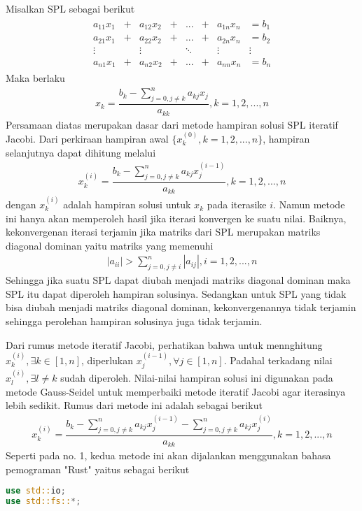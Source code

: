 \documentclass[12pt]{article}
\begin{document}
\begin{enumerate}
{        Misalkan SPL sebagai berikut
        \begin{align*}
            \begin{matrix}
                a_{11}x_1 & + & a_{12}x_2 & + & ...   & + & a_{1n}x_n & = b_1 \\
                a_{21}x_1 & + & a_{22}x_2 & + & ...   & + & a_{2n}x_n & = b_2 \\
                \vdots    &   & \vdots    &   & \ddots&   & \vdots      & \vdots \\
                a_{n1}x_1 & + & a_{n2}x_2 & + &...    & + & a_{nn}x_n & = b_n 
            \end{matrix}
        \end{align*}
        Maka berlaku
        \begin{align*}
            x_k = \dfrac{b_k - \displaystyle\sum_{j = 0, j \ne k}^n a_{kj}x_j}{a_{kk}}, k = 1,2, ..., n
        \end{align*}
        Persamaan diatas merupakan dasar dari metode hampiran solusi SPL iteratif Jacobi. Dari perkiraan hampiran awal $ \{x_k^{(0)}, k = 1,2,...,n\} $, hampiran selanjutnya dapat dihitung melalui
        \begin{align*}
            x_k^{(i)} = \dfrac{b_k - \displaystyle\sum_{j = 0, j \ne k}^n a_{kj}x_j^{(i-1)}}{a_{kk}}, k = 1,2, ..., n
        \end{align*}
        dengan $ x_k^{(i)} $ adalah hampiran solusi untuk $ x_k $ pada iterasike $ i $. Namun metode ini hanya akan memperoleh hasil jika iterasi konvergen ke suatu nilai. Baiknya, kekonvergenan iterasi terjamin jika matriks dari SPL merupakan matriks diagonal dominan yaitu matriks yang memenuhi
        \begin{align*}
            |a_{ii}| > \sum_{j = 0, j \ne i}^n |a_{ij}|, i = 1,2,...,n
        \end{align*}
        Sehingga jika suatu SPL dapat diubah menjadi matriks diagonal dominan maka SPL itu dapat diperoleh hampiran solusinya. Sedangkan untuk SPL yang tidak bisa diubah menjadi matriks diagonal dominan, kekonvergenannya tidak terjamin sehingga perolehan hampiran solusinya juga tidak terjamin.\bigskip

        Dari rumus metode iteratif Jacobi, perhatikan bahwa untuk mennghitung $ x_k^{(i)}, \exists k \in [1,n] $, diperlukan $ x_j^{(i-1)}, \forall j \in [1,n] $. Padahal terkadang nilai $ x_l^{(i)}, \exists l \ne k $ sudah diperoleh. Nilai-nilai hampiran solusi ini digunakan pada metode Gauss-Seidel untuk memperbaiki metode iteratif Jacobi agar iterasinya lebih sedikit. Rumus dari metode ini adalah sebagai berikut
        \begin{align*}
            x_k^{(i)} = \dfrac{b_k - \displaystyle\sum_{j = 0, j \ne k}^n a_{kj}x_j^{(i-1)} - \sum_{j = 0, j \ne k}^n a_{kj}x_j^{(i)}}{a_{kk}}, k = 1,2, ..., n
        \end{align*}
        Seperti pada no. 1, kedua metode ini akan dijalankan menggunakan bahasa pemograman "Rust" yaitus sebagai berikut
        \begin{lstlisting}[language=Rust, style=colouredRust, basicstyle=\fontsize{6.7pt}{8pt}\selectfont\color{white}\ttfamily]
use std::io;
use std::fs::*;


\end{lstlisting}}
\end{enumerate}
\end{document}
